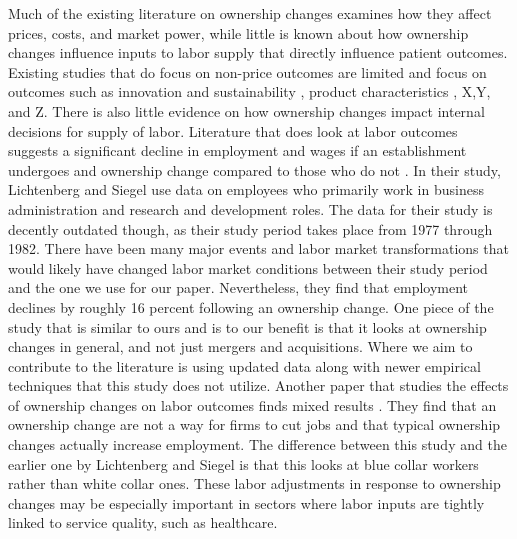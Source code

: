 \documentclass[preprint,authoryear]{elsarticle}
\begin{document}
Much of the existing literature on ownership changes examines how they affect prices, costs, and market power, while little is known about how ownership changes influence inputs to labor supply that directly influence patient outcomes. Existing studies that do focus on non-price outcomes are limited and focus on outcomes such as innovation and sustainability \citep{haucap_stiebale_2023}, product characteristics \citep{fan_2013}, X,Y, and Z. There is also little evidence on how ownership changes impact internal decisions for supply of labor. Literature that does look at labor outcomes suggests a significant decline in employment and wages if an establishment undergoes and ownership change compared to those who do not \citep{lichtenberg_siegel_1990}. In their study, Lichtenberg and Siegel use data on employees who primarily work in business administration and research and development roles. The data for their study is decently outdated though, as their study period takes place from 1977 through 1982. There have been many major events and labor market transformations that would likely have changed labor market conditions between their study period and the one we use for our paper. Nevertheless, they find that employment declines by roughly 16 percent following an ownership change. One piece of the study that is similar to ours and is to our benefit is that it looks at ownership changes in general, and not just mergers and acquisitions. Where we aim to contribute to the literature is using updated data along with newer empirical techniques that this study does not utilize. Another paper that studies the effects of ownership changes on labor outcomes finds mixed results \citep{mcguckin_nguyen_2001}. They find that an ownership change are not a way for firms to cut jobs and that typical ownership changes actually increase employment. The difference between this study and the earlier one by Lichtenberg and Siegel is that this looks at blue collar workers rather than white collar ones. These labor adjustments in response to ownership changes may be especially important in sectors where labor inputs are tightly linked to service quality, such as healthcare. \\
\end{document}
